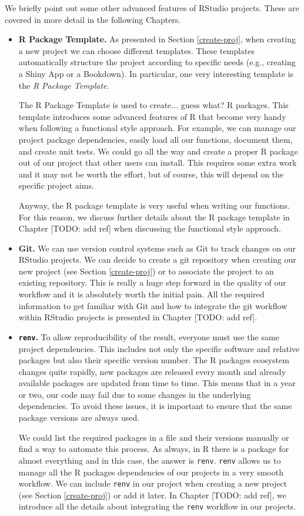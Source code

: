 \documentclass[
  11pt,
]{book}
\begin{document}
We briefly point out some other advanced features of RStudio projects. These are covered in more detail in the following Chapters.

\begin{itemize}
\item
  \textbf{R Package Template.} As presented in Section \ref{create-proj}, when creating a new project we can choose different templates. These templates automatically structure the project according to specific needs (e.g., creating a Shiny App or a Bookdown). In particular, one very interesting template is the \emph{R Package Template}.

  The R Package Template is used to create\(\ldots\) guess what? R packages. This template introduces some advanced features of R that become very handy when following a functional style approach. For example, we can manage our project package dependencies, easily load all our functions, document them, and create unit tests. We could go all the way and create a proper R package out of our project that other users can install. This requires some extra work and it may not be worth the effort, but of course, this will depend on the specific project aims.

  Anyway, the R package template is very useful when writing our functions. For this reason, we discuss further details about the R package template in Chapter {[}TODO: add ref{]} when discussing the functional style approach.
\item
  \textbf{Git.} We can use version control systems such as Git to track changes on our RStudio projects. We can decide to create a git repository when creating our new project (see Section \ref{create-proj}) or to associate the project to an existing repository. This is really a huge step forward in the quality of our workflow and it is absolutely worth the initial pain. All the required information to get familiar with Git and how to integrate the git workflow within RStudio projects is presented in Chapter {[}TODO: add ref{]}.
\item
  \textbf{\texttt{renv}.} To allow reproducibility of the result, everyone must use the same project dependencies. This includes not only the specific software and relative packages but also their specific version number. The R packages ecosystem changes quite rapidly, new packages are released every month and already available packages are updated from time to time. This means that in a year or two, our code may fail due to some changes in the underlying dependencies. To avoid these issues, it is important to ensure that the same package versions are always used.

  We could list the required packages in a file and their versions manually or find a way to automate this process. As always, in R there is a package for almost everything and in this case, the answer is \texttt{renv}. \texttt{renv} allows us to manage all the R packages dependencies of our projects in a very smooth workflow. We can include \texttt{renv} in our project when creating a new project (see Section \ref{create-proj}) or add it later. In Chapter {[}TODO: add ref{]}, we introduce all the details about integrating the \texttt{renv} workflow in our projects.
\end{itemize}
\end{document}

